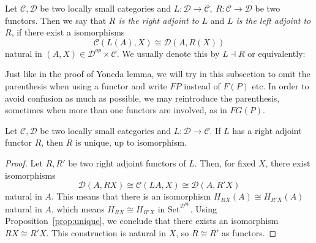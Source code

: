 \begin{definition}[2.1.1]\label{def:adj} Let $\mathcal{C},\mathcal{D}$ be two locally small categories and $L:\mathcal{D}\to\mathcal{C},\ R:\mathcal{C}\to\mathcal{D}$ be two functors. Then we say that \emph{$R$ is the right adjoint to $L$} and \emph{$L$ is the left adjoint to $R$}, if there exist a isomorphisms
\begin{equation}
\mathcal{C}(L(A),X)\cong\mathcal{D}(A,R(X))\label{adj}
\end{equation}
natural in $(A,X)\in\mathcal{D}^{op}\times\mathcal{C}$. We usually denote this by $L\dashv R$ or equivalently:
\vspace*{-0.2em}
\begin{center}
\end{center}
\end{definition}
\begin{notation} Just like in the proof of Yoneda lemma, we will try in this subsection to omit the parenthesis when using a functor and write $FP$ instead of $F(P)$ etc. In order to avoid confusion as much as possible, we may reintroduce the parenthesis, sometimes when more than one functors are involved, as in $FG(P)$.
\end{notation}

\begin{proposition}[4.3.13] Let $\mathcal{C},\mathcal{D}$ be two locally small categories and $L:\mathcal{D}\to\mathcal{C}$. If $L$ has a right adjoint functor $R$, then $R$ is unique, up to isomorphism.
\end{proposition}
\begin{proof} Let $R,R'$ be two right adjoint functors of $L$. Then, for fixed $X$, there exist isomorphisms
\[\mathcal{D}(A,RX)\cong\mathcal{C}(LA,X)\cong\mathcal{D}(A,R'X)\]
natural in $A$. This means that there is an isomorphism $H_{RX}(A)\cong H_{R'X}(A)$ natural in $A$, which means $H_{RX}\cong H_{R'X}$ in $\mathrm{Set}^{\mathcal{D}^{\mathrm{op}}}$. Using Proposition~\ref{prop:unique}, we conclude that there exists an isomorphism $RX\cong R'X$. This construction is natural in $X$, so $R\cong R'$ as functors.
\end{proof}


